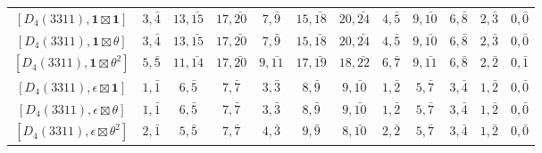 \begin{table}[ht]
\begin{adjustbox}{max width=\linewidth}
\begin{tabular}{|c|ccccccccccc|}
        $[D_4(3311), \mathbf{1}\boxtimes\mathbf{1}]$ & $3, \bar{4}$ & $13, \bar{15}$ & $17, \bar{20}$ & $7, \bar{9}$ & $15, \bar{18}$ & $20, \bar{24}$ & $4, \bar{5}$ & $9, \bar{10}$ & $6, \bar{8}$ & $2, \bar{3}$ & $0, \bar{0}$ \\ 
        $[D_4(3311), \mathbf{1}\boxtimes\theta]$ & $3, \bar{4}$ & $13, \bar{15}$ & $17, \bar{20}$ & $7, \bar{9}$ & $15, \bar{18}$ & $20, \bar{24}$ & $4, \bar{5}$ & $9, \bar{10}$ & $6, \bar{8}$ & $2, \bar{3}$ & $0, \bar{0}$ \\ 
        $[D_4(3311), \mathbf{1}\boxtimes\theta^2]$ & $5, \bar{5}$ & $11, \bar{14}$ & $17, \bar{20}$ & $9, \bar{11}$ & $17, \bar{19}$ & $18, \bar{22}$ & $6, \bar{7}$ & $9, \bar{11}$ & $6, \bar{8}$ & $2, \bar{2}$ & $0, \bar{1}$ \\ 
        $[D_4(3311), \epsilon\boxtimes\mathbf{1}]$ & $1, \bar{1}$ & $6, \bar{5}$ & $7, \bar{7}$ & $3, \bar{3}$ & $8, \bar{9}$ & $9, \bar{10}$ & $1, \bar{2}$ & $5, \bar{7}$ & $3, \bar{4}$ & $1, \bar{2}$ & $0, \bar{0}$ \\
        $[D_4(3311), \epsilon\boxtimes\theta]$ & $1, \bar{1}$ & $6, \bar{5}$ & $7, \bar{7}$ & $3, \bar{3}$ & $8, \bar{9}$ & $9, \bar{10}$ & $1, \bar{2}$ & $5, \bar{7}$ & $3, \bar{4}$ & $1, \bar{2}$ & $0, \bar{0}$ \\ 
        $[D_4(3311), \epsilon\boxtimes\theta^2]$ & $2, \bar{1}$ & $5, \bar{5}$ & $7, \bar{7}$ & $4, \bar{3}$ & $9, \bar{9}$ & $8, \bar{10}$ & $2, \bar{2}$ & $5, \bar{7}$ & $3, \bar{4}$ & $1, \bar{2}$ & $0, \bar{0}$ \\\hline

        \end{tabular}
        \end{adjustbox}
    \end{table}

